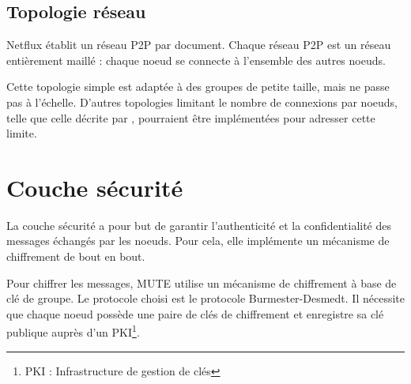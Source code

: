 \documentclass[12pt]{thesul}
\begin{document}
\subsection{Topologie réseau}

Netflux établit un réseau \ac{P2P} par document.
Chaque réseau \ac{P2P} est un réseau entièrement maillé : chaque noeud se connecte à l'ensemble des autres noeuds.

Cette topologie simple est adaptée à des groupes de petite taille, mais ne passe pas à l'échelle.
D'autres topologies limitant le nombre de connexions par noeuds, telle que celle décrite par \cite{2018-spray-nedelec}, pourraient être implémentées pour adresser cette limite.



\section{Couche sécurité}

La couche sécurité a pour but de garantir l'authenticité et la confidentialité des messages échangés par les noeuds.
Pour cela, elle implémente un mécanisme de chiffrement de bout en bout.

Pour chiffrer les messages, MUTE utilise un mécanisme de chiffrement à base de clé de groupe.
Le protocole choisi est le protocole Burmester-Desmedt\cite{1995-burmester-desmedt}.
Il nécessite que chaque noeud possède une paire de clés de chiffrement et enregistre sa clé publique auprès d'un PKI\footnote{\acf{PKI} : Infrastructure de gestion de clés}.
\end{document}

